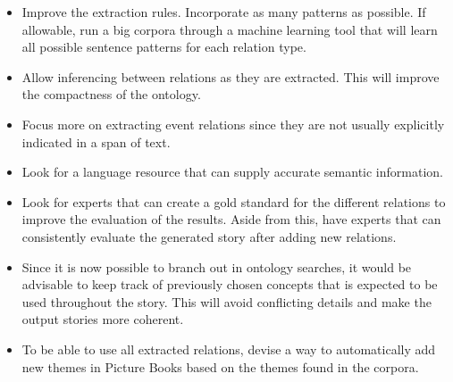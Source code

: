 \begin{itemize}
\item Improve the extraction rules. Incorporate as many patterns as possible. If allowable, run a big corpora through a machine learning tool that will learn all possible sentence patterns for each relation type.
\item Allow inferencing between relations as they are extracted. This will improve the compactness of the ontology.
\item Focus more on extracting event relations since they are not usually explicitly indicated in a span of text. 
\item Look for a language resource that can supply accurate semantic information.
\item Look for experts that can create a gold standard for the different relations to improve the evaluation of the results. Aside from this, have experts that can consistently evaluate the generated story after adding new relations.
\item Since it is now possible to branch out in ontology searches, it would be advisable to keep track of previously chosen concepts that is expected to be used throughout the story. This will avoid conflicting details and make the output stories more coherent.
\item To be able to use all extracted relations, devise a way to automatically add new themes in Picture Books based on the themes found in the corpora. 
\end{itemize}









